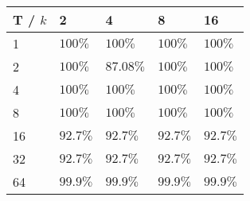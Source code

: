 \documentclass{article}
\begin{document}
    \noindent\begin{minipage}{0.45\textwidth}
        \begin{table}[H]
            \begin{center}
                \begin{tabular}[c]{|l|l|l|l|l|}
                    \hline
                    T / \( k \) & 2& 4 & 8 & 16   \\
                    \hline
                    1&\( 100\% \)&\( 100\% \)& \( 100\% \)&\( 100\% \) \\
                    \hline
                    2&\( 100\% \)&\( 87.08\% \)& \( 100\% \)&\( 100\% \) \\
                    \hline
                    4&\( 100\% \)&\( 100\% \)& \( 100\% \)&\( 100\% \) \\
                    \hline
                    8&\( 100\% \)&\( 100\% \)& \( 100\% \)&\( 100\% \) \\
                    \hline
                    16&\( 92.7\% \)&\( 92.7\% \)&\( 92.7\% \)&\( 92.7\% \)  \\
                    \hline
                    32&\( 92.7\% \)&\( 92.7\% \)&\( 92.7\% \)&\( 92.7\% \)  \\
                    \hline
                    64&\( 99.9\% \)&\( 99.9\% \)&\( 99.9\% \)&\( 99.9\% \)  \\
                    \hline
                \end{tabular}
            \end{center}
        \end{table}
    \end{minipage}
\end{document}
